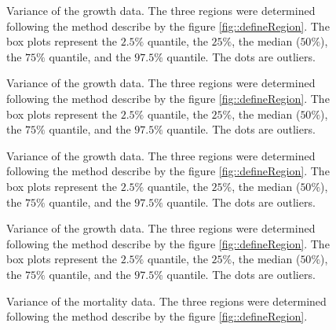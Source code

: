 \documentclass[letterpaper, 12pt]{article}
\theoremstyle{theo}
\begin{document}
\begin{refsection}
\begin{onehalfspace}
\begin{figure}
	\centering
	
	\caption[Growth variation, species 4--6]{Variance of the growth data. The three regions were determined following the method describe by the figure \ref{fig::defineRegion}. The box plots represent the $ 2.5 \%$ quantile, the $ 25 \% $, the median ($ 50 \% $), the $ 75 \% $ quantile, and the $ 97.5 \% $ quantile. The dots are outliers. \label{fig::growthVar4-6}}
\end{figure}

\begin{figure}
	\centering
	
	\caption[Growth variation, species 7--9]{Variance of the growth data. The three regions were determined following the method describe by the figure \ref{fig::defineRegion}. The box plots represent the $ 2.5 \%$ quantile, the $ 25 \% $, the median ($ 50 \% $), the $ 75 \% $ quantile, and the $ 97.5 \% $ quantile. The dots are outliers. \label{fig::growthVar7-9}}
\end{figure}

\begin{figure}
	\centering
	
	\caption[Growth variation, species 10--12]{Variance of the growth data. The three regions were determined following the method describe by the figure \ref{fig::defineRegion}. The box plots represent the $ 2.5 \%$ quantile, the $ 25 \% $, the median ($ 50 \% $), the $ 75 \% $ quantile, and the $ 97.5 \% $ quantile. The dots are outliers. \label{fig::growthVar10-12}}
\end{figure}

\begin{figure}
	\centering
	
	\caption[Growth variation, species 13--14]{Variance of the growth data. The three regions were determined following the method describe by the figure \ref{fig::defineRegion}. The box plots represent the $ 2.5 \%$ quantile, the $ 25 \% $, the median ($ 50 \% $), the $ 75 \% $ quantile, and the $ 97.5 \% $ quantile. The dots are outliers. \label{fig::growthVar13-14}}
\end{figure}

\begin{figure}
	\centering
	
	\caption[Mortality variation, species 1--3]{Variance of the mortality data. The three regions were determined following the method describe by the figure \ref{fig::defineRegion}. \label{fig::mortalityVar1-3}}
\end{figure}


\end{onehalfspace}
\end{refsection}
\end{document}
